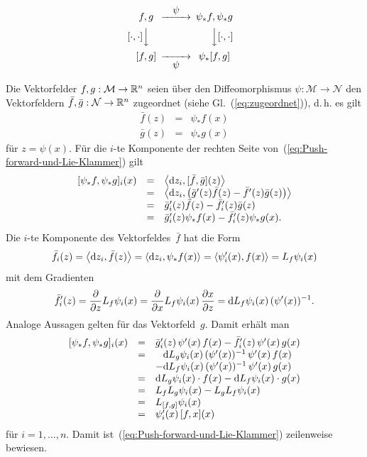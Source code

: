 \[
\begin{CD}
f,g @>{\displaystyle\psi}>>\psi_*f,\psi_*g\\
@V{\displaystyle[\cdot,\cdot]}VV @VV{\displaystyle[\cdot,\cdot]}V\\
[f,g] @>>{\displaystyle\psi}> \psi_*[f,g]
\end{CD}
\]
\begin{svmultproof2}
Die Vektorfelder $f,g:\mathcal{M}\to{\mathbb{R}}^{n}$ seien über den Diffeomorphismus
$\psi:\mathcal{M}\to\mathcal{N}$ den Vektorfeldern $\bar{f},\bar{g}:\mathcal{N}\to{\mathbb{R}}^{n}$
zugeordnet (siehe Gl.~(\ref{eq:zugeordnet})), d.\,h. es gilt 
\[
\begin{array}{rcl}
\bar{f}(z) & = & \psi_{*}f(x)\\
\bar{g}(z) & = & \psi_{*}g(x)
\end{array}
\]
für $z=\psi(x)$. Für die $i$-te Komponente der rechten Seite von~(\ref{eq:Push-forward-und-Lie-Klammer})
gilt 
\[
\begin{array}{rcl}
[\psi_{*}f,\psi_{*}g]_{i}(x) & = & \left\langle {\mathrm{d}} z_{i},[\bar{f},\bar{g}](z)\right\rangle \\
 & = & \left\langle {\mathrm{d}} z_{i},\left(\bar{g}^{\prime}(z)\bar{f}(z)-\bar{f}^{\prime}(z)\bar{g}(z)\right)\right\rangle \\
 & = & \bar{g}_{i}^{\prime}(z)\bar{f}(z)-\bar{f}_{i}^{\prime}(z)\bar{g}(z)\\
 & = & \bar{g}_{i}^{\prime}(z)\psi_{*}f(x)-\bar{f}_{i}^{\prime}(z)\psi_{*}g(x).
\end{array}
\]
Die $i$-te Komponente des Vektorfeldes~$\bar{f}$ hat die Form
\[
\bar{f}_{i}(z)=\left\langle {\mathrm{d}} z_{i},\bar{f}(z)\right\rangle =\left\langle {\mathrm{d}} z_{i},\psi_{*}f(x)\right\rangle =\left\langle \psi_{i}^{\prime}(x),f(x)\right\rangle =L_{f}\psi_{i}(x)
\]
mit dem Gradienten 
\[
\bar{f}_{i}^{\prime}(z)=\frac{\partial}{\partial z}L_{f}\psi_{i}(x)=\frac{\partial}{\partial x}L_{f}\psi_{i}(x)\,\frac{\partial x}{\partial z}={\mathrm{d}} L_{f}\psi_{i}(x)\,(\psi^{\prime}(x))^{-1}.
\]
Analoge Aussagen gelten für das Vektorfeld~$g$. Damit erhält man
\[
\begin{array}{rcl}
[\psi_{*}f,\psi_{*}g]_{i}(x) & = & \bar{g}_{i}^{\prime}(z)\,\psi^{\prime}(x)\,f(x)-\bar{f}_{i}^{\prime}(z)\,\psi^{\prime}(x)\,g(x)\\
 & = & \phantom{-}{\mathrm{d}} L_{g}\psi_{i}(x)\,(\psi^{\prime}(x))^{-1}\,\psi^{\prime}(x)\,f(x)\\
 &  & -{\mathrm{d}} L_{f}\psi_{i}(x)\,(\psi^{\prime}(x))^{-1}\,\psi^{\prime}(x)\,g(x)\\
 & = & {\mathrm{d}} L_{g}\psi_{i}(x)\cdot f(x)-{\mathrm{d}} L_{f}\psi_{i}(x)\cdot g(x)\\
 & = & L_{f}L_{g}\psi_{i}(x)-L_{g}L_{f}\psi_{i}(x)\\
 & = & L_{[f,g]}\psi_{i}(x)\\
 & = & \psi_{i}^{\prime}(x)\,[f,x](x)
\end{array}
\]
für $i=1,\ldots,n$. Damit ist~(\ref{eq:Push-forward-und-Lie-Klammer})
zeilenweise bewiesen.
\end{svmultproof2}



